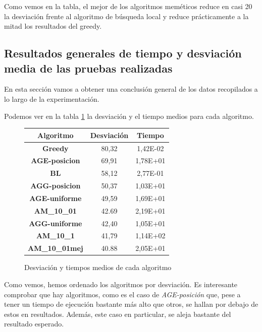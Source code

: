 Como vemos en la tabla, el mejor de los algoritmos meméticos reduce en casi 20 la desviación frente al algoritmo de búsqueda local y reduce prácticamente a la mitad los resultados del greedy.


\subsection{Resultados generales de tiempo y desviación media de las pruebas realizadas}

En esta sección vamos a obtener una conclusión general de los datos recopilados a lo largo de la experimentación.

Podemos ver en la tabla \ref{fig:resultadosGenerales} la desviación y el tiempo medios para cada algoritmo.

\begin{figure}[H]
    \centering
    \begin{tabular}{|c|c|c|}
        \hline
        Algoritmo & \textbf{Desviación} & \textbf{Tiempo}\\
        \hline
        \textbf{Greedy} & 80,32 & 1,42E-02\\
        \hline
        \textbf{AGE-posicion} & 69,91 & 1,78E+01\\
        \hline
        \textbf{BL} & 58,12 & 2,77E-01\\
        \hline
        \textbf{AGG-posicion} & 50,37 & 1,03E+01\\
        \hline
        \textbf{AGE-uniforme} & 49,59 & 1,69E+01\\
        \hline
        \textbf{AM\_10\_01} & 42.69 & 2,19E+01\\
        \hline
        \textbf{AGG-uniforme} & 42,40 & 1,05E+01\\
        \hline
        \textbf{AM\_10\_1} & 41,79 & 1,14E+02\\
        \hline
        \textbf{AM\_10\_01mej} & 40.88 & 2,05E+01\\
        \hline
    \end{tabular}
    \caption{Desviación y tiempos medios de cada algoritmo}
    \label{fig:resultadosGenerales}
\end{figure}

Como vemos, hemos ordenado los algoritmos por desviación. Es interesante comprobar que hay algoritmos, como es el caso de \textit{AGE-posición} que, pese a tener un tiempo de ejecución bastante más alto que otros, se hallan por debajo de estos en resultados. Además, este caso en particular, se aleja bastante del resultado esperado.

